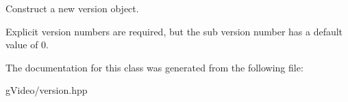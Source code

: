 Construct a new version object. 

Explicit version numbers are required, but the sub version number has a default value of 0. 

The documentation for this class was generated from the following file\-:\begin{DoxyCompactItemize}
\item 
g\-Video/version.\-hpp\end{DoxyCompactItemize}
